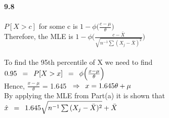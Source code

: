 {\bf 9.8}\\

\\

$P[X > c]$ for some c is $1-\phi{\Big( \frac{c-\mu}{\theta}} \Big)$\\

Therefore, the MLE is $1-\phi{\Big(\frac{c-\bar{X}}{\sqrt{n^{-1} \sum{(X_j - \bar{X})^2}}}} \Big)$\\

\\

To find the 95th percentile of X we need to find\\

$0.95 \enskip = \enskip P[X > x] \enskip = \enskip \phi{\Big( \frac{x- \mu}{\theta}} \Big)$\\

Hence, $\frac{x-\mu}{\theta}$ = 1.645 $\enskip \Rightarrow \enskip x=\text{1.645}\theta + \mu$\\

By applying the MLE from Part(a) it is shown that\\

$\hat{x} \enskip = \enskip \text{1.645} \sqrt{n^{-1} \sum{(X_j - \bar{X})^2}} + \bar{X}$\\
